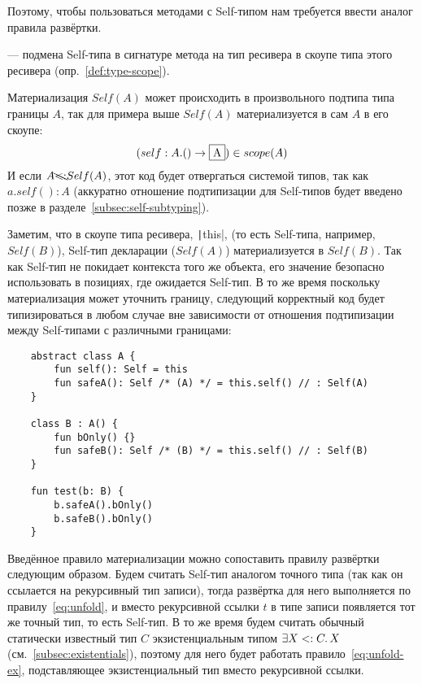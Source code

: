 Поэтому, чтобы пользоваться методами с Self-типом нам требуется ввести аналог правила развёртки.

\begin{definition}
    \label{def:materialization}
     --- подмена Self-типа в сигнатуре метода на тип ресивера в скоупе типа этого ресивера (опр.~\ref{def:type-scope}).
\end{definition}

Материализация $Self(A)$ может происходить в произвольного подтипа типа границы $A$, так для примера выше $Self(A)$ материализуется в сам $A$ в его скоупе:
\[(self: A.() \to \framebox{A}) \in scope(A)\]
И если $A \bcancel{<:} Self(A)$, этот код будет отвергаться системой типов, так как $a.self() : A$ (аккуратно отношение подтипизации для Self-типов будет введено позже в разделе~\ref{subsec:self-subtyping}).

Заметим, что в скоупе типа ресивера, \texttt|this|, (то есть Self-типа, например, $Self(B)$), Self-тип декларации ($Self(A)$) материализуется в $Self(B)$.
Так как Self-тип не покидает контекста того же объекта, его значение безопасно использовать в позициях, где ожидается Self-тип.
В то же время поскольку материализация может уточнить границу, следующий корректный код будет типизироваться в любом случае вне зависимости от отношения подтипизации между Self-типами с различными границами:

\begin{verbatim}
    abstract class A {
        fun self(): Self = this
        fun safeA(): Self /* (A) */ = this.self() // : Self(A)
    }

    class B : A() {
        fun bOnly() {}
        fun safeB(): Self /* (B) */ = this.self() // : Self(B)
    }

    fun test(b: B) {
        b.safeA().bOnly()
        b.safeB().bOnly()
    }
\end{verbatim}

Введённое правило материализации можно сопоставить правилу развёртки следующим образом.
Будем считать Self-тип аналогом точного типа (так как он ссылается на рекурсивный тип записи), тогда развёртка для него выполняется по правилу~\eqref{eq:unfold}, и вместо рекурсивной ссылки $t$ в типе записи появляется тот же точный тип, то есть Self-тип.
В то же время будем считать обычный статически известный тип $C$ экзистенциальным типом $\exists X <: C \ldotp X$ (см.~\ref{subsec:existentials}), поэтому для него будет работать правило~\eqref{eq:unfold-ex}, подставляющее экзистенциальный тип вместо рекурсивной ссылки.


